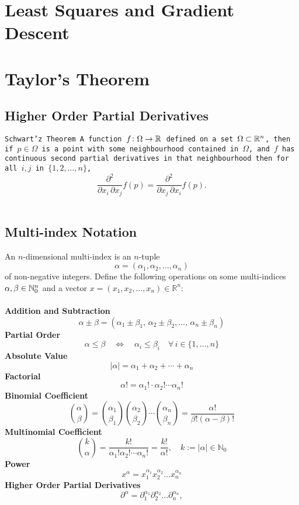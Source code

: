 \documentclass[11pt,a4paper]{article}
\begin{document}
\newpage

\section{Least Squares and Gradient Descent}

\newpage

\section{Taylor's Theorem}
\subsection{Higher Order Partial Derivatives}
\begin{theorem}
  \tt{Schwart'z Theorem}
  A function $f \colon \Omega \to \mathbb{R}$ defined
  on a set $\Omega \subset \mathbb{R}^n$, then if $p \in \Omega$ is a point
  with some neighbourhood contained in $\Omega$, and $f$ has continuous
  second partial derivatives in that neighbourhood then for all $i,j$
  in $\{1,2,\dots,n\}$,
  \[
    {\frac {\partial ^{2}}{\partial x_{i}\,
    \partial x_{j}}}f({p})={\frac {\partial ^{2}}{\partial x_{j}\,
    \partial x_{i}}}f({p}).
  \]
\end{theorem}

\subsection{Multi-index Notation}
An $n$-dimensional multi-index is an $n$-tuple
\[
  \alpha = (\alpha_{1},\alpha_{2},\ldots,\alpha_{n})
\]
of non-negative integers. Define the following operations on some
multi-indices $\alpha ,\beta \in \mathbb{N}_{0}^{n}$ and a vector
$x=(x_{1},x_{2},\ldots ,x_{n})\in \mathbb {R} ^{n}$: \\
\phantom{} \\
\textbf{Addition and Subtraction}
\[
  \alpha \pm \beta =
  (\alpha _{1}\pm \beta _{1},\,\alpha _{2}\pm 
  \beta _{2},\ldots ,\,\alpha _{n}\pm \beta _{n})
\]
\textbf{Partial Order}
\[
  \alpha \leq \beta \quad \Leftrightarrow \quad 
  \alpha _{i}\leq \beta _{i}\quad \forall \,i\in \{1,\ldots ,n\}
\]
\textbf{Absolute Value}
\[
  |\alpha |=\alpha _{1}+\alpha _{2}+\cdots +\alpha _{n}
\]
\textbf{Factorial}
\[
  \alpha !=\alpha _{1}!\cdot \alpha _{2}!\cdots \alpha _{n}!
\]
\textbf{Binomial Coefficient}
\[
  {\binom {\alpha}{\beta}} = 
  {\binom {\alpha_{1}}{\beta_{1}}}
  {\binom {\alpha_{2}}{\beta_{2}}}\cdots 
  {\binom {\alpha_{n}}{\beta_{n}}} = 
  {\frac {\alpha!}{\beta! (\alpha-\beta)!}}
\]
\textbf{Multinomial Coefficient}
\[
  {\binom {k}{\alpha}} = 
  {\frac {k!}{\alpha_{1}!\alpha_{2}! \cdots \alpha_{n}!}} = 
  {\frac {k!}{\alpha!}}, 
  \quad k:=|\alpha |\in \mathbb {N}_{0}
\]
\textbf{Power}
\[
  x^{\alpha} = 
  x_{1}^{\alpha_{1}}x_{2}^{\alpha_{2}}\ldots x_{n}^{\alpha_{n}}
\]
\textbf{Higher Order Partial Derivatives}
\[
  \partial^{\alpha} = 
  \partial_{1}^{\alpha _{1}}
  \partial _{2}^{\alpha _{2}} \ldots 
  \partial _{n}^{\alpha _{n}},
\]
\end{document}
